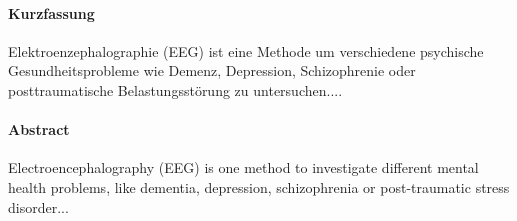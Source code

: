\cleardoublepage

\begin{center}
\paragraph{Kurzfassung}
\hrulefill
\end{center}
Elektroenzephalographie (EEG) ist eine Methode um verschiedene psychische Gesundheitsprobleme wie Demenz, Depression, Schizophrenie oder posttraumatische Belastungsstörung zu untersuchen....


\vspace {2cm}
\begin{center}
\paragraph{Abstract}
\hrulefill
\end{center}
Electroencephalography (EEG) is one method to investigate different mental health problems, like dementia, depression, schizophrenia or post-traumatic stress disorder...
